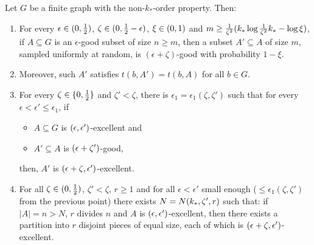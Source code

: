         \begin{lemma} \label{lem:even_partition_of_excellent_parts}
            Let $G$ be a finite graph with the non-$k_{*}$-order property.
            Then:
            \begin{enumerate}[label=(\alph*), ref=\alph*]
                \item \label{itm:even_partition_of_excellent_parts.1} For every $\epsilon \in ( 0, \frac{1}{2} )$,
                    $\zeta \in ( 0, \frac{1}{2} - \epsilon )$, $\xi \in ( 0, 1 )$ and
                    $m \geq \frac{1}{\zeta^2}( k_* \log{\frac{1}{\zeta^2}k_*} - \log{\xi} )$,
                    if $A \subseteq G$ is an $\epsilon$-good subset of size $n \geq m$,
                    then a subset $A' \subseteq A$ of size $m$, sampled uniformly at random, is $(\epsilon + \zeta)$-good with probability $1-\xi$.
                \item \label{itm:even_partition_of_excellent_parts.1*} Moreover, such $A'$ satisfies $t(b, A') = t(b, A)$ for all $b \in G$.
                \item \label{itm:even_partition_of_excellent_parts.2} For every $\zeta \in \{ 0, \frac{1}{2} \}$ and $\zeta' < \zeta$, there is
                    $\epsilon_1 = \epsilon_1(\zeta, \zeta')$ such that for every $\epsilon < \epsilon' \leq \epsilon_1$, if
                    \begin{itemize}
                        \item $A \subseteq G$ is $( \epsilon, \epsilon' )$-excellent and
                        \item $A' \subseteq A$ is $( \epsilon + \zeta' )$-good,
                    \end{itemize}
                    then, $A'$ is $( \epsilon + \zeta, \epsilon' )$-excellent.
                \item \label{itm:even_partition_of_excellent_parts.3} For all $\zeta \in ( 0, \frac{1}{2} )$, $\zeta' < \zeta$, $r \geq 1$ and for all
                    $\epsilon < \epsilon'$ small enough ($\leq \epsilon_1(\zeta, \zeta')$ from the previous point) there exists
                    $N = N( k_{*}, \zeta', r )$ such that: if $|A| = n > N$, $r$ divides $n$ and $A$ is
                    $( \epsilon, \epsilon' )$-excellent, then there exists a partition into $r$ disjoint pieces of equal
                    size, each of which is $( \epsilon + \zeta, \epsilon' )$-excellent.

\end{enumerate}
\end{lemma}
